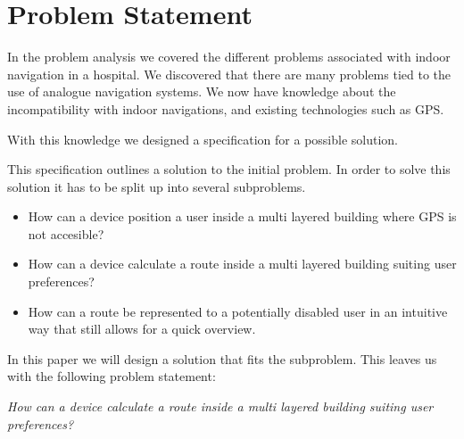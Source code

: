 \chapter{Problem Statement}




In the problem analysis we covered the different problems associated with indoor navigation in a hospital.
We discovered that there are many problems tied to the use of analogue navigation systems. We now have knowledge about the incompatibility with indoor navigations, and existing technologies such as GPS.



With this knowledge we designed a specification for a possible solution.




This specification outlines a solution to the initial problem. In order to solve this solution it has to be split up into several subproblems.

\begin{itemize}
	\item How can a device position a user inside a multi layered building where GPS is not accesible?
	\item How can a device calculate a route inside a multi layered building suiting user preferences?
	\item How can a route be represented to a potentially disabled user in an intuitive way that still allows for a quick overview.
\end{itemize}

In this paper we will design a solution that fits the  subproblem. This leaves us with the following problem statement:

\begin{displayquote}
    \textit{How can a device calculate a route inside a multi layered building suiting user preferences?}\label{sub:problem_statement}
\end{displayquote}

